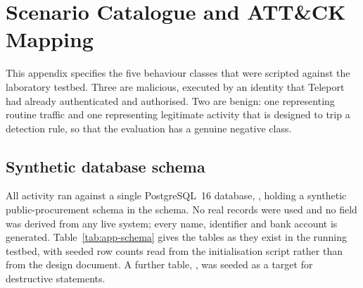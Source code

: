 \section{Scenario Catalogue and ATT\&CK Mapping}
\label{app:scenarios}

This appendix specifies the five behaviour classes that were scripted against the
laboratory testbed. Three are malicious, executed by an identity that Teleport had
already authenticated and authorised. Two are benign: one representing routine
traffic and one representing legitimate activity that is designed to trip a
detection rule, so that the evaluation has a genuine negative class.

\subsection{Synthetic database schema}
\label{app:scenarios:schema}

All activity ran against a single PostgreSQL~16 database, ,
holding a synthetic public-procurement schema in the  schema. No real
records were used and no field was derived from any live system; every name,
identifier and bank account is generated. Table~\ref{tab:app-schema} gives the tables
as they exist in the running testbed, with seeded row counts read from the
initialisation script rather than from the design document. A further table,
, was seeded as a target for destructive statements.

